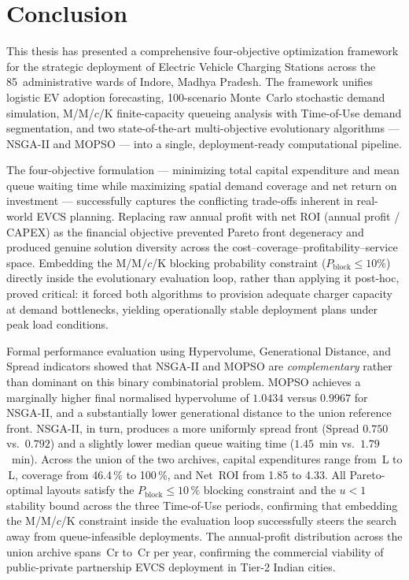 \section{Conclusion}

This thesis has presented a comprehensive four-objective optimization framework
for the strategic deployment of Electric Vehicle Charging Stations across the
85~administrative wards of Indore, Madhya Pradesh. The framework unifies
logistic EV adoption forecasting, 100-scenario Monte~Carlo stochastic demand
simulation, M/M/$c$/K finite-capacity queueing analysis with Time-of-Use
demand segmentation, and two state-of-the-art multi-objective evolutionary
algorithms --- NSGA-II and MOPSO --- into a single, deployment-ready
computational pipeline.

The four-objective formulation --- minimizing total capital expenditure and
mean queue waiting time while maximizing spatial demand coverage and net
return on investment --- successfully captures the conflicting trade-offs
inherent in real-world EVCS planning. Replacing raw annual profit with net
ROI (annual profit / CAPEX) as the financial objective prevented Pareto
front degeneracy and produced genuine solution diversity across the
cost--coverage--profitability--service space. Embedding the M/M/$c$/K
blocking probability constraint ($P_{\text{block}} \leq 10\%$) directly
inside the evolutionary evaluation loop, rather than applying it
post-hoc, proved critical: it forced both algorithms to provision
adequate charger capacity at demand bottlenecks, yielding
operationally stable deployment plans under peak load conditions.

Formal performance evaluation using Hypervolume, Generational
Distance, and Spread indicators showed that NSGA-II and MOPSO are
\emph{complementary} rather than dominant on this binary
combinatorial problem. MOPSO achieves a marginally higher final
normalised hypervolume of $1.0434$ versus $0.9967$ for NSGA-II,
and a substantially lower generational distance to the union
reference front. NSGA-II, in turn, produces a more uniformly
spread front (Spread $0.750$ vs.\ $0.792$) and a slightly lower
median queue waiting time ($1.45$~min vs.\ $1.79$~min). Across the
union of the two archives, capital expenditures range from
\,L to \,L, coverage from 46.4\,\% to 100\,\%,
and Net~ROI from 1.85 to 4.33. All Pareto-optimal layouts satisfy
the $P_{\text{block}} \leq 10\,\%$ blocking constraint and the
$u < 1$ stability bound across the three Time-of-Use periods,
confirming that embedding the M/M/$c$/K constraint inside the
evaluation loop successfully steers the search away from
queue-infeasible deployments. The annual-profit distribution
across the union archive spans \,Cr to \,Cr per
year, confirming the commercial viability of public-private
partnership EVCS deployment in Tier-2 Indian cities.

